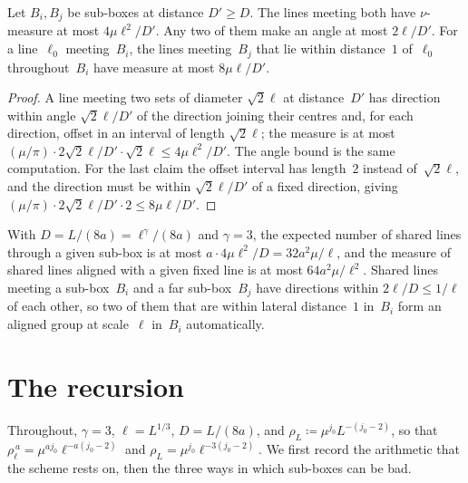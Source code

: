 \documentclass[11pt,letterpaper]{article}
\begin{document}
\begin{lemma}
\label{lem:sharedcount}
Let $B_i,B_j$ be sub-boxes at distance $D'\ge D$. The lines meeting both have $\nu$-measure at most $4\mu\ell^2/D'$. Any two of them make an angle at most $2\ell/D'$. For a line~$\ell_0$ meeting~$B_i$, the lines meeting~$B_j$ that lie within distance~$1$ of~$\ell_0$ throughout~$B_i$ have measure at most $8\mu\ell/D'$.
\end{lemma}

\begin{proof}
A line meeting two sets of diameter $\sqrt2\ell$ at distance~$D'$ has direction within angle $\sqrt2\ell/D'$ of the direction joining their centres and, for each direction, offset in an interval of length $\sqrt2\ell$; the measure is at most $(\mu/\pi)\cdot2\sqrt2\ell/D'\cdot\sqrt2\ell\le4\mu\ell^2/D'$. The angle bound is the same computation. For the last claim the offset interval has length~$2$ instead of~$\sqrt2\ell$, and the direction must be within $\sqrt2\ell/D'$ of a fixed direction, giving $(\mu/\pi)\cdot2\sqrt2\ell/D'\cdot2\le8\mu\ell/D'$.
\end{proof}

With $D=L/(8a)=\ell^\gamma/(8a)$ and $\gamma=3$, the expected number of shared lines through a given sub-box is at most $a\cdot4\mu\ell^2/D=32a^2\mu/\ell$, and the measure of shared lines aligned with a given fixed line is at most $64a^2\mu/\ell^2$. Shared lines meeting a sub-box~$B_i$ and a far sub-box~$B_j$ have directions within $2\ell/D\le1/\ell$ of each other, so two of them that are within lateral distance~$1$ in~$B_i$ form an aligned group at scale~$\ell$ in~$B_i$ automatically.

\section{The recursion}
\label{sec:recursion}

Throughout, $\gamma=3$, $\ell=L^{1/3}$, $D=L/(8a)$, and $\rho_L\coloneqq\mu^{j_0}L^{-(j_0-2)}$, so that $\rho_\ell^{\,a}=\mu^{aj_0}\ell^{-a(j_0-2)}$ and $\rho_L=\mu^{j_0}\ell^{-3(j_0-2)}$. We first record the arithmetic that the scheme rests on, then the three ways in which sub-boxes can be bad.
\end{document}
